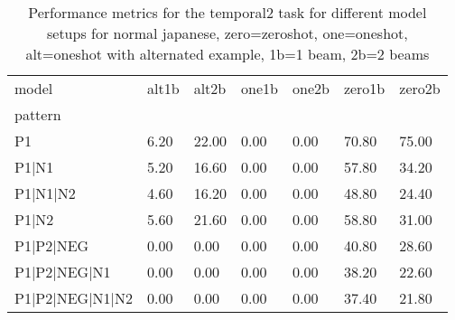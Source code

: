\begin{table}[h]
\begin{tabular}{l|llllll}
\toprule
model & alt1b & alt2b & one1b & one2b & zero1b & zero2b \\
pattern &  &  &  &  &  &  \\
\midrule
P1 & 6.20 & 22.00 & 0.00 & 0.00 & 70.80 & 75.00 \\
P1|N1 & 5.20 & 16.60 & 0.00 & 0.00 & 57.80 & 34.20 \\
P1|N1|N2 & 4.60 & 16.20 & 0.00 & 0.00 & 48.80 & 24.40 \\
P1|N2 & 5.60 & 21.60 & 0.00 & 0.00 & 58.80 & 31.00 \\
P1|P2|NEG & 0.00 & 0.00 & 0.00 & 0.00 & 40.80 & 28.60 \\
P1|P2|NEG|N1 & 0.00 & 0.00 & 0.00 & 0.00 & 38.20 & 22.60 \\
P1|P2|NEG|N1|N2 & 0.00 & 0.00 & 0.00 & 0.00 & 37.40 & 21.80 \\
\bottomrule
\end{tabular}
\caption{Performance metrics for the temporal2 task for different model setups for normal japanese, zero=zeroshot, one=oneshot, alt=oneshot with alternated example, 1b=1 beam, 2b=2 beams}
\label{tab:ja norm_temporal2_performance}
\end{table}
